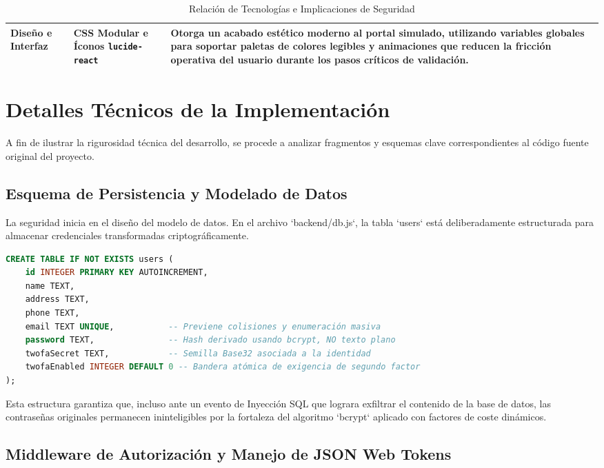 \documentclass[12pt,a4paper]{article}
\begin{document}
\begin{table}[H]
\begin{tabularx}{\textwidth}{@{} l >{\raggedright\arraybackslash}X >{\raggedright\arraybackslash}X @{}}
        \textbf{Diseño e Interfaz} & CSS Modular e Íconos \texttt{lucide-react} & Otorga un acabado estético moderno al portal simulado, utilizando variables globales para soportar paletas de colores legibles y animaciones que reducen la fricción operativa del usuario durante los pasos críticos de validación. \\
        \bottomrule
    \end{tabularx}
    \caption{Relación de Tecnologías e Implicaciones de Seguridad}
    \label{tab:herramientas}
\end{table}

\section{Detalles Técnicos de la Implementación}

A fin de ilustrar la rigurosidad técnica del desarrollo, se procede a analizar fragmentos y esquemas clave correspondientes al código fuente original del proyecto.

\subsection{Esquema de Persistencia y Modelado de Datos}

La seguridad inicia en el diseño del modelo de datos. En el archivo `backend/db.js`, la tabla `users` está deliberadamente estructurada para almacenar credenciales transformadas criptográficamente.

\begin{lstlisting}[language=SQL, caption={Definición de la estructura de usuarios y controles 2FA}]
CREATE TABLE IF NOT EXISTS users (
    id INTEGER PRIMARY KEY AUTOINCREMENT,
    name TEXT,
    address TEXT,
    phone TEXT,
    email TEXT UNIQUE,           -- Previene colisiones y enumeración masiva
    password TEXT,               -- Hash derivado usando bcrypt, NO texto plano
    twofaSecret TEXT,            -- Semilla Base32 asociada a la identidad
    twofaEnabled INTEGER DEFAULT 0 -- Bandera atómica de exigencia de segundo factor
);
\end{lstlisting}
Esta estructura garantiza que, incluso ante un evento de Inyección SQL que lograra exfiltrar el contenido de la base de datos, las contraseñas originales permanecen ininteligibles por la fortaleza del algoritmo `bcrypt` aplicado con factores de coste dinámicos.

\subsection{Middleware de Autorización y Manejo de JSON Web Tokens}
\end{document}
